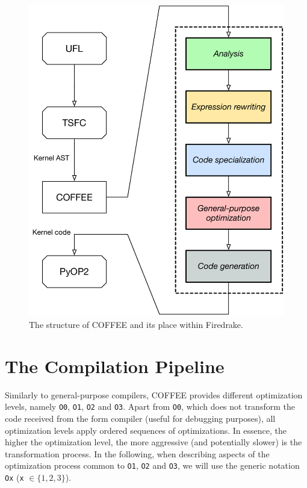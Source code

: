 \begin{figure}
\centering
\includegraphics[scale=0.50]{coffee/pictures/coffee-pipeline.pdf}
\caption{The structure of COFFEE and its place within Firedrake.}
\label{fig:coffee-pipeline}
\end{figure}

\section{The Compilation Pipeline}
Similarly to general-purpose compilers, COFFEE provides different optimization levels, namely \texttt{O0}, \texttt{O1}, \texttt{O2} and \texttt{O3}. Apart from \texttt{O0}, which does not transform the code received from the form compiler (useful for debugging purposes), all optimization levels apply ordered sequences of optimizations. In essence, the higher the optimization level, the more aggressive (and potentially slower) is the transformation process. In the following, when describing aspects of the optimization process common to \texttt{O1}, \texttt{O2} and \texttt{O3}, we will use the generic notation \texttt{Ox} (\texttt{x} $\in \lbrace 1, 2, 3\rbrace$).

